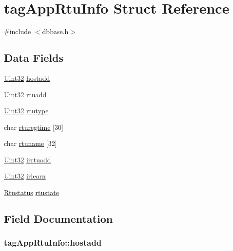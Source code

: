 \hypertarget{structtagAppRtuInfo}{\section{tag\-App\-Rtu\-Info Struct Reference}
\label{structtagAppRtuInfo}
}


{\ttfamily \#include $<$dbbase.\-h$>$}

\subsection*{Data Fields}
\begin{DoxyCompactItemize}
\item 
\hyperlink{base_8h_a60cf7b3c038ce37a50796e8eaddf0b5f}{Uint32} \hyperlink{structtagAppRtuInfo_abb7f1b2868e506eb6843a46276c0025d}{hostadd}
\item 
\hyperlink{base_8h_a60cf7b3c038ce37a50796e8eaddf0b5f}{Uint32} \hyperlink{structtagAppRtuInfo_aa763eb3681fe89a03dcf87c79ac6df63}{rtuadd}
\item 
\hyperlink{base_8h_a60cf7b3c038ce37a50796e8eaddf0b5f}{Uint32} \hyperlink{structtagAppRtuInfo_a7a0f5b530b144daff9442a2e6bb20fb5}{rtutype}
\item 
char \hyperlink{structtagAppRtuInfo_a0d11ebdeaf5f73682276b9a089d53037}{rturegtime} \mbox{[}30\mbox{]}
\item 
char \hyperlink{structtagAppRtuInfo_a975da1456b430065bede03ccc568ea23}{rtuname} \mbox{[}32\mbox{]}
\item 
\hyperlink{base_8h_a60cf7b3c038ce37a50796e8eaddf0b5f}{Uint32} \hyperlink{structtagAppRtuInfo_a868cfa5637ef8689900e576265382e67}{irrtuadd}
\item 
\hyperlink{base_8h_a60cf7b3c038ce37a50796e8eaddf0b5f}{Uint32} \hyperlink{structtagAppRtuInfo_a1facea1e4a80a6c92aed8bcb7d141165}{irlearn}
\item 
\hyperlink{dbbase_8h_a78dcbe2d7ae67051ae97baded9edcb05}{Rtustatus} \hyperlink{structtagAppRtuInfo_a9fed15b73bfbfe8b1b2e0d125044f38c}{rtustate}
\end{DoxyCompactItemize}


\subsection{Field Documentation}
\hypertarget{structtagAppRtuInfo_abb7f1b2868e506eb6843a46276c0025d}{
\subsubsection[{hostadd}]{ tag\-App\-Rtu\-Info\-::hostadd}}\label{structtagAppRtuInfo_abb7f1b2868e506eb6843a46276c0025d}



